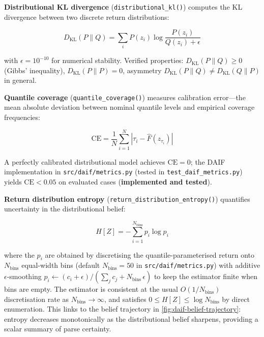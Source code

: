 \documentclass[
]{article}
\begin{document}
\textbf{Distributional KL divergence} (\texttt{distributional\_kl()})
computes the KL divergence between two discrete return distributions:

\begin{equation}
D_{\mathrm{KL}}(P \| Q) = \sum_{i} P(z_i) \log \frac{P(z_i)}{Q(z_i) + \epsilon}
\label{eq:eq-7c-dkl}
\end{equation}

with \(\epsilon = 10^{-10}\) for numerical stability. Verified
properties: \(D_{\mathrm{KL}}(P\|Q) \geq 0\) (Gibbs' inequality),
\(D_{\mathrm{KL}}(P\|P) = 0\), asymmetry
\(D_{\mathrm{KL}}(P\|Q) \neq D_{\mathrm{KL}}(Q\|P)\) in general.

\textbf{Quantile coverage} (\texttt{quantile\_coverage()}) measures
calibration error---the mean absolute deviation between nominal quantile
levels and empirical coverage frequencies:

\begin{equation}
\mathrm{CE} = \frac{1}{N} \sum_{i=1}^{N} \left| \tau_i - \hat{F}(z_{\tau_i}) \right|
\label{eq:eq-7c-ce}
\end{equation}

A perfectly calibrated distributional model achieves
\(\mathrm{CE} = 0\); the DAIF implementation in
\texttt{src/daif/metrics.py} (tested in \texttt{test\_daif\_metrics.py})
yields \(\mathrm{CE} < 0.05\) on evaluated cases (\textbf{implemented
and tested}).

\textbf{Return distribution entropy}
(\texttt{return\_distribution\_entropy()}) quantifies uncertainty in the
distributional belief:

\begin{equation}
H[Z] = -\sum_{i=1}^{N_{\text{bins}}} p_i \log p_i
\label{eq:eq-7c-entropy}
\end{equation}

where the \(p_i\) are obtained by discretising the
quantile-parameterised return onto \(N_{\text{bins}}\) equal-width bins
(default \(N_{\text{bins}}=50\) in \texttt{src/daif/metrics.py}) with
additive \(\epsilon\)-smoothing
\(p_i \leftarrow (c_i + \epsilon) / (\sum_j c_j + N_{\text{bins}}\,\epsilon)\)
to keep the estimator finite when bins are empty. The estimator is
consistent at the usual \(O(1/N_{\text{bins}})\) discretisation rate as
\(N_{\text{bins}} \to \infty\), and satisfies
\(0 \le H[Z] \le \log N_{\text{bins}}\) by direct enumeration. This
links to the belief trajectory in \autoref{fig:daif-belief-trajectory}:
entropy decreases monotonically as the distributional belief sharpens,
providing a scalar summary of parse certainty.
\end{document}
